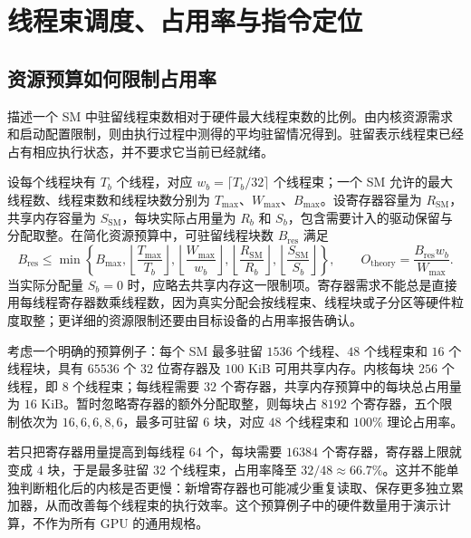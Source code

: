 \section{线程束调度、占用率与指令定位}
\label{l14:sec:scheduling}

\subsection{资源预算如何限制占用率}

描述一个 SM 中驻留线程束数相对于硬件最大线程束数的比例。由内核资源需求和启动配置限制，则由执行过程中测得的平均驻留情况得到。驻留表示线程束已经占有相应执行状态，并不要求它当前已经就绪。

设每个线程块有 $T_b$ 个线程，对应 $w_b=\lceil T_b/32\rceil$ 个线程束；一个 SM 允许的最大线程数、线程束数和线程块数分别为 $T_{\max}$、$W_{\max}$、$B_{\max}$。设寄存器容量为 $R_{\mathrm{SM}}$，共享内存容量为 $S_{\mathrm{SM}}$，每块实际占用量为 $R_b$ 和 $S_b$，包含需要计入的驱动保留与分配取整。在简化资源预算中，可驻留线程块数 $B_{\mathrm{res}}$ 满足
\begin{equation}
 B_{\mathrm{res}}\leq\min\left\{
 B_{\max},\left\lfloor\frac{T_{\max}}{T_b}\right\rfloor,
 \left\lfloor\frac{W_{\max}}{w_b}\right\rfloor,
 \left\lfloor\frac{R_{\mathrm{SM}}}{R_b}\right\rfloor,
 \left\lfloor\frac{S_{\mathrm{SM}}}{S_b}\right\rfloor
 \right\},\qquad
 O_{\mathrm{theory}}=\frac{B_{\mathrm{res}}w_b}{W_{\max}}.
 \label{l14:eq:occupancy}
\end{equation}
当实际分配量 $S_b=0$ 时，应略去共享内存这一限制项。寄存器需求不能总是直接用每线程寄存器数乘线程数，因为真实分配会按线程束、线程块或子分区等硬件粒度取整；更详细的资源限制还要由目标设备的占用率报告确认。

考虑一个明确的预算例子：每个 SM 最多驻留 $1536$ 个线程、$48$ 个线程束和 $16$ 个线程块，具有 $65536$ 个 $32$ 位寄存器及 $100$ KiB 可用共享内存。内核每块 $256$ 个线程，即 $8$ 个线程束；每线程需要 $32$ 个寄存器，共享内存预算中的每块总占用量为 $16$ KiB。暂时忽略寄存器的额外分配取整，则每块占 $8192$ 个寄存器，五个限制依次为 $16,6,6,8,6$，最多可驻留 $6$ 块，对应 $48$ 个线程束和 $100\%$ 理论占用率。

若只把寄存器用量提高到每线程 $64$ 个，每块需要 $16384$ 个寄存器，寄存器上限就变成 $4$ 块，于是最多驻留 $32$ 个线程束，占用率降至 $32/48\approx66.7\%$。这并不能单独判断粗化后的内核是否更慢：新增寄存器也可能减少重复读取、保存更多独立累加器，从而改善每个线程束的执行效率。这个预算例子中的硬件数量用于演示计算，不作为所有 GPU 的通用规格。


